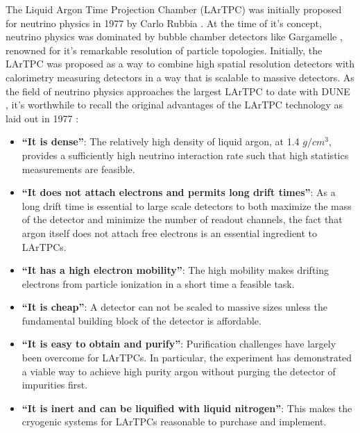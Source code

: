 The Liquid Argon Time Projection Chamber (LArTPC) was initially proposed for neutrino physics in 1977 by Carlo Rubbia \cite{Rubbia:1977zz}.  At the time of it's concept, neutrino physics was dominated by bubble chamber detectors like Gargamelle \cite{gargamelle}, renowned for it's remarkable resolution of particle topologies.  Initially, the LArTPC was proposed as a way to combine high spatial resolution detectors with calorimetry measuring detectors in a way that is scalable to massive detectors.  As the field of neutrino physics approaches the largest LArTPC to date with DUNE \cite{DUNE}, it's worthwhile to recall the original advantages of the LArTPC technology as laid out in 1977 \cite{Rubbia:1977zz}:

\begin{itemize}

\item{\bf ``It is dense''}: The relatively high density of liquid argon, at 1.4 $g/cm^3$, provides a sufficiently high neutrino interaction rate such that high statistics measurements are feasible.

\item{\bf ``It does not attach electrons and permits long drift times''}: As a long drift time is essential to large scale detectors to both maximize the mass of the detector and minimize the number of readout channels, the fact that argon itself does not attach free electrons is an essential ingredient to LArTPCs.

\item{\bf ``It has a high electron mobility''}: The high mobility makes drifting electrons from particle ionization in a short time a feasible task.

\item{\bf ``It is cheap''}:  A detector can not be scaled to massive sizes unless the fundamental building block of the detector is affordable.

\item{\bf ``It is easy to obtain and purify''}: Purification challenges have largely been overcome for LArTPCs.  In particular, the \uboone experiment has demonstrated a viable way to achieve high purity argon without purging the detector of impurities first.

\item{\bf ``It is inert and can be liquified with liquid nitrogen''}: This makes the cryogenic systems for LArTPCs reasonable to purchase and implement.

\end{itemize}

